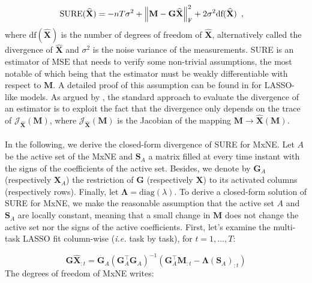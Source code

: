 \begin{align} \label{eq:7}
    \text{SURE}(\widehat{\mathbf{X}})
    &= -nT\sigma^2 + \left \lVert 
        \mathbf{M} - \mathbf{G}\widehat{\mathbf{X}}
     \right \rVert_{\text{F}}^2
    + 2 \sigma^2 \text{df}(\widehat{\mathbf{X}})
    \enspace ,
\end{align}
%
where $\text{df}(\widehat{\mathbf{X}})$ is the number of degrees of freedom of $\widehat{\mathbf{X}}$,
alternatively called the divergence of $\widehat{\mathbf{X}}$ and $\sigma^2$ is the noise variance of the measurements. 
SURE is an estimator of $\text{MSE}$ that needs to verify some non-trivial assumptions, 
the most notable of which being that the estimator must be weakly differentiable with respect to $\mathbf{M}$. 
A detailed proof of this assumption can be found in \cite{Zou_Hastie_Tibshirani07}
for LASSO-like models. As argued by \cite{Deledalle_Vaiter_Fadili_Peyre14}, the standard approach to evaluate the divergence
of an estimator is to exploit the fact that the divergence only depends on the trace of $\mathcal{J}_{\widehat{\mathbf{X}}}(\mathbf{M})$,
where $\mathcal{J}_{\widehat{\mathbf{X}}}(\mathbf{M})$ is the Jacobian of the mapping $\mathbf{M} \rightarrow \widehat{\mathbf{X}}(\mathbf{M})$.
\\
\\
In the following, we derive the closed-form divergence of SURE for MxNE. Let $A$ be the active set 
of the MxNE and $\mathbf{S}_A$ a matrix filled at every time instant with the signs of the coefficients of the active set. 
Besides, we denote by $\mathbf{G}_A$ (respectively $\mathbf{X}_A$) the restriction of $\mathbf{G}$ (respectively $\mathbf{X}$) to its activated
columns (respectively rows). Finally, let $\mathbf{\Lambda} = \text{diag}(\lambda)$.
To derive a closed-form solution of SURE for MxNE, we make the reasonable assumption that the active set $A$ and $\mathbf{S}_A$ are locally constant, 
meaning that a small change in $\mathbf{M}$ does not change the active set nor the signs of the active 
coefficients. First, let's examine the multi-task LASSO fit column-wise (\textit{i.e.} task by task), for 
$t = 1, \dots, T$:

\begin{equation*}
    \mathbf{G\widehat{X}}_{:t}
    = \mathbf{G}_A (\mathbf{G}_A^{\top}\mathbf{G}_A)^{-1}
    \left(
        \mathbf{G}^{\top}_{A}\mathbf{M}_{:t}
        -
        \mathbf{\Lambda} (\mathbf{S}_{A})_{:t}
    \right)
\end{equation*}
%
The degrees of freedom of MxNE writes:

